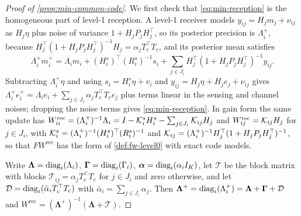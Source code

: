 \begin{proof}[Proof of \cref{prop:min-common-code}]
We first check that \eqref{eq:min-reception} is the homogeneous part of level-1 reception. A level-1 receiver models $y_{ij}=H_jm_j+\nu_{ij}$ as $H_j\eta$ plus noise of variance $1+H_jP_jH_j^\top$, so its posterior precision is $\Lambda^+_i$, because $H_j^\top(1+H_jP_jH_j^\top)^{-1}H_j=\alpha_jT_c^\top T_c$, and its posterior mean satisfies
\[
\Lambda^+_im^+_i=\Lambda_im_i+(H^s_i)^\top(R^s_i)^{-1}s_i+\sum_{j\in J_i}H_j^\top(1+H_jP_jH_j^\top)^{-1}y_{ij}.
\]
Subtracting $\Lambda^+_i\eta$ and using $s_i=H^s_i\eta+v_i$ and $y_{ij}=H_j\eta+H_je_j+\nu_{ij}$ gives $\Lambda^+_ie^+_i=\Lambda_ie_i+\sum_{j\in J_i}\alpha_jT_c^\top T_ce_j$ plus terms linear in the sensing and channel noises; dropping the noise terms gives \eqref{eq:min-reception}. In gain form the same update has $W^{\mathrm{rec}}_{ii}=(\Lambda^+_i)^{-1}\Lambda_i=I-\mathcal{K}^s_iH^s_i-\sum_{j\in J_i}\mathcal{K}_{ij}H_j$ and $W^{\mathrm{rec}}_{ij}=\mathcal{K}_{ij}H_j$ for $j\in J_i$, with $\mathcal{K}^s_i=(\Lambda^+_i)^{-1}(H^s_i)^\top(R^s_i)^{-1}$ and $\mathcal{K}_{ij}=(\Lambda^+_i)^{-1}H_j^\top(1+H_jP_jH_j^\top)^{-1}$, so that $FW^{\mathrm{rec}}$ has the form of \cref{def:fw-level0} with exact code models.

Write $\boldsymbol\Lambda=\operatorname{diag}_i(\Lambda_i)$, $\boldsymbol\Gamma=\operatorname{diag}_i(\Gamma_i)$, $\boldsymbol\alpha=\operatorname{diag}_i(\alpha_iI_K)$, let $\mathcal T$ be the block matrix with blocks $\mathcal T_{ij}=\alpha_jT_c^\top T_c$ for $j\in J_i$ and zero otherwise, and let $\mathcal D=\operatorname{diag}_i(\bar\alpha_iT_c^\top T_c)$ with $\bar\alpha_i=\sum_{j\in J_i}\alpha_j$. Then $\boldsymbol\Lambda^+=\operatorname{diag}_i(\Lambda^+_i)=\boldsymbol\Lambda+\boldsymbol\Gamma+\mathcal D$ and $W^{\mathrm{rec}}=(\boldsymbol\Lambda^+)^{-1}(\boldsymbol\Lambda+\mathcal T)$.


\end{proof}
